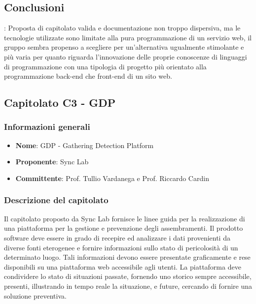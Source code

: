 		\subsection{Conclusioni}:
			Proposta di capitolato valida e documentazione non troppo dispersiva, ma le tecnologie utilizzate sono limitate alla pura programmazione di un servizio web, il gruppo sembra propenso a scegliere per un’alternativa ugualmente stimolante e più varia per quanto riguarda l’innovazione delle proprie conoscenze di linguaggi di programmazione con una tipologia di progetto più orientato alla programmazione back-end che front-end di un sito web.

				
	\subsection{Capitolato C3 - GDP}
		\subsubsection{Informazioni generali}
			\begin{itemize}
				\item\textbf{Nome}: GDP - Gathering Detection Platform
				\item\textbf{Proponente}: Sync Lab
				\item\textbf{Committente}: Prof. Tullio Vardanega e Prof. Riccardo Cardin
			\end{itemize}
			
		\subsubsection{Descrizione del capitolato}
			Il capitolato proposto da Sync Lab fornisce le linee guida per la realizzazione di una piattaforma per la gestione e prevenzione degli assembramenti. 
			Il prodotto software deve essere in grado di recepire ed analizzare i dati provenienti da diverse fonti eterogenee e fornire informazioni sullo stato di pericolosità di un determinato luogo.
			Tali informazioni devono essere presentate graficamente e rese disponibili su una piattaforma web accessibile agli utenti. La piattaforma deve condividere lo stato di situazioni passate, fornendo uno storico sempre accessibile, presenti, illustrando in tempo reale la situazione, e future, cercando di fornire una soluzione preventiva.

